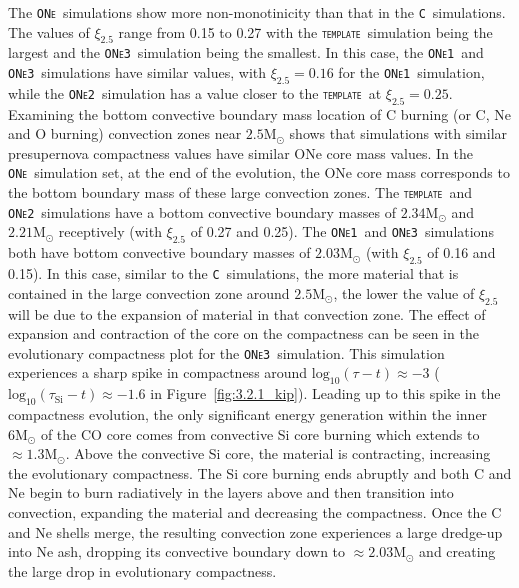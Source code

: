 \documentclass[useAMS,usenatbib]{mn2e}
\newcommand{\Msun}{\ensuremath{\mathrm{M}_\odot}}
\newcommand{\template}{\textsc{\texttt{template}}}
\newcommand{\ONea}{\textsc{\texttt{ONe1}}}
\newcommand{\ONeb}{\textsc{\texttt{ONe2}}}
\newcommand{\ONec}{\textsc{\texttt{ONe3}}}
\newcommand{\C}{\textsc{\texttt{C}}}
\newcommand{\ONe}{\textsc{\texttt{ONe}}}
\begin{document}
The \ONe~simulations show more non-monotinicity than that in the \C~simulations.
The values of $\xi_{2.5}$ range from 0.15 to 0.27 with the \template\
simulation being the largest and the \ONec\ simulation being the smallest. In
this case, the \ONea\ and \ONec\ simulations have similar values, with
$\xi_{2.5}=0.16$ for the \ONea\ simulation, while the \ONeb\ simulation has a
value closer to the \template\ at $\xi_{2.5}=0.25$. Examining the bottom 
convective boundary mass location of C burning (or C, Ne and O burning) 
convection zones near $2.5\Msun$ shows that simulations with similar 
presupernova compactness values have similar ONe core mass values. 
In the \ONe\ simulation set, at the end of the evolution, the ONe core mass 
corresponds to the bottom boundary mass of these large convection zones. 
The \template\ and \ONeb\ simulations have a bottom convective boundary 
masses of $2.34\Msun$ and $2.21\Msun$ receptively (with $\xi_{2.5}$ of 0.27 
and 0.25). The \ONea\ and \ONec\ simulations both have bottom convective 
boundary masses of $2.03\Msun$ (with $\xi_{2.5}$ of 0.16 and 0.15). In this 
case, similar to the \C\ simulations, the more material that is contained in the 
large convection zone around $2.5\Msun$, the lower the value of $\xi_{2.5}$ 
will be due to the expansion of material in that convection zone. The effect of 
expansion and contraction of the core on the compactness can be seen in the
evolutionary compactness plot for the \ONec\ simulation. This simulation 
experiences a sharp spike in compactness around 
$\mathrm{log}_{10}(\tau-t)\approx -3$ ($\mathrm{log}_{10}(\tau_{\mathrm{Si}}-t) 
\approx -1.6$ in Figure~\ref{fig:3.2.1_kip}). Leading up to this spike in the 
compactness evolution, the only significant energy generation within the 
inner $6\Msun$ of the CO core comes from convective Si core burning 
which extends to $\approx 1.3\Msun$. Above the convective Si core, 
the material is contracting, increasing the evolutionary compactness. The 
Si core burning ends abruptly and both C and Ne begin to burn radiatively 
in the layers above and then transition into convection, expanding the 
material and decreasing the compactness. Once the C and Ne shells 
merge, the resulting convection zone experiences a large dredge-up into 
Ne ash, dropping its convective boundary down to $\approx 2.03\Msun$ 
and creating the large drop in evolutionary compactness.  
\end{document}
